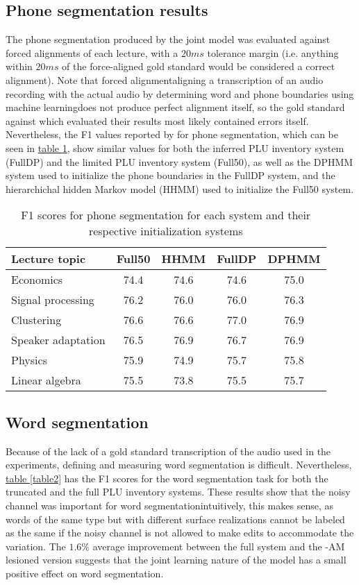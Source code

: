 \documentclass[12pt,letterpaper]{article}
\begin{document}
\subsection{Phone segmentation results}
The phone segmentation produced by the joint model was evaluated against forced alignments of each lecture, with a $20ms$ tolerance margin (i.e. anything within $20ms$ of the force-aligned gold standard would be considered a correct alignment). Note that forced alignment\textemdash aligning a transcription of an audio recording with the actual audio by determining word and phone boundaries using machine learning\textemdash does not produce perfect alignment itself, so the gold standard against which \citet{lee:2015} evaluated their results most likely contained errors itself. Nevertheless, the F1 values reported by \citet{lee:2015} for phone segmentation, which can be seen in \hyperref[table1]{table \ref*{table1}}, show similar values for both the inferred PLU inventory system (FullDP) and the limited PLU inventory system (Full50), as well as the DPHMM system used to initialize the phone boundaries in the FullDP system, and the hierarchichal hidden Markov model (HHMM) used to initialize the Full50 system. 
\begin{table}
\begin{tabular}{|l|c|c||c|c|}
\hline
Lecture topic&Full50&HHMM&FullDP&DPHMM\\
\hline \hline
Economics&74.4&74.6&74.6&75.0\\
\hline
Signal processing&76.2&76.0&76.0&76.3\\
\hline
Clustering&76.6&76.6&77.0&76.9\\
\hline
Speaker adaptation&76.5&76.9&76.7&76.9\\
\hline
Physics&75.9&74.9&75.7&75.8\\
\hline
Linear algebra&75.5&73.8&75.5&75.7\\
\hline

\end{tabular}
\caption{F1 scores for phone segmentation for each system and their respective initialization systems}
\label{table1}
\end{table}

\subsection{Word segmentation}
Because of the lack of a gold standard transcription of the audio used in the experiments, defining and measuring word segmentation is difficult. Nevertheless, \hyperref[table2]{table \ref*{table2}} has the F1 scores for the word segmentation task for both the truncated and the full PLU inventory systems. These results show that the noisy channel was important for word segmentation\textemdash intuitively, this makes sense, as words of the same type but with different surface realizations cannot be labeled as the same if the noisy channel is not allowed to make edits to accommodate the variation. The $1.6\%$ average improvement between the full system and the -AM lesioned version suggests that the joint learning nature of the model has a small positive effect on word segmentation.
\end{document}
